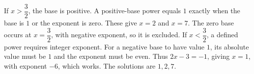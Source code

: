 If $x>\dfrac{3}{2}$, the base is positive. A positive-base power equals $1$ exactly when the base is $1$ or the exponent is zero. These give $x=2$ and $x=7$. The zero base occurs at $x=\dfrac{3}{2}$, with negative exponent, so it is excluded. If $x<\dfrac{3}{2}$, a defined power requires integer exponent. For a negative base to have value $1$, its absolute value must be $1$ and the exponent must be even. Thus $2x-3=-1$, giving $x=1$, with exponent $-6$, which works. The solutions are $\boxed{1,2,7}$.
